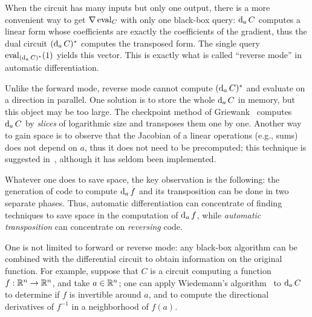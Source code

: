 When the circuit has many inputs but only one output, there is a more
convenient way to get $\nabla \operatorname{eval}_C$ with only one black-box query:
$\operatorname{d}_aC$ computes a linear form whose coefficients are exactly the
coefficients of the gradient, thus the dual circuit
$(\operatorname{d}_aC)^\ast$ computes the transposed form. The single query
$\operatorname{eval}_{(\operatorname{d}_aC)^\ast}(1)$ yields this vector. This is exactly
what is called ``reverse mode'' in automatic differentiation. 

\begin{remark}
  Unlike the forward mode, reverse mode cannot compute
  $(\operatorname{d}_aC)^\ast$ and evaluate on a direction in parallel. One
  solution is to store the whole $\operatorname{d}_aC$ in memory, but this object
  may be too large. The checkpoint method of
  Griewank~\cite{griewank92} computes $\operatorname{d}_aC$ by \emph{slices} of
  logarithmic size and transposes them one by one. Another way to gain
  space is to observe that the Jacobian of a linear operations (e.g.,
  sums) does not depend on $a$, thus it does not need to be
  precomputed; this technique is suggested
  in~\cite{gilbert+levey+masse91}, although it has seldom been
  implemented.

  Whatever one does to save space, the key observation is the
  following: the generation of code to compute $\operatorname{d}_a f$ and its
  transposition can be done in two separate phases. Thus, automatic
  differentiation can concentrate of finding techniques to save space
  in the computation of $\operatorname{d}_a f$, while
  \emph{automatic transposition} can
  concentrate on \emph{reversing} code.
\end{remark}

\begin{nota}
  One is not limited to forward or reverse mode: any black-box
  algorithm can be combined with the differential circuit to obtain
  information on the original function. For example, suppose that $C$
  is a circuit computing a function $f:\mathbb{R}^n\rightarrow\mathbb{R}^n$, and take
  $a\in\mathbb{R}^n$; one can apply Wiedemann's
  algorithm~\cite{wiedemann:sparse} to $\operatorname{d}_aC$ to determine if $f$
  is invertible around $a$, and to compute the directional derivatives
  of $f^{-1}$ in a neighborhood of $f(a)$.
\end{nota}




%
